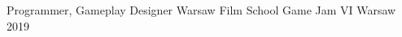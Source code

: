 

\begin{cvhonors}

  \cvhonor
    {Programmer, Gameplay Designer} %
    {Warsaw Film School Game Jam VI} %
    {Warsaw} %
    {2019} %

\end{cvhonors}
